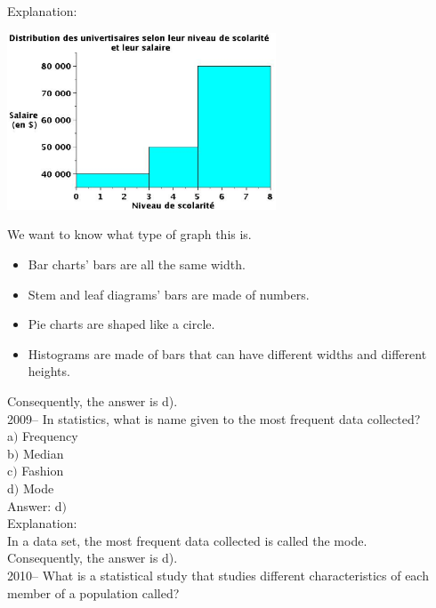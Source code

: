 \documentclass[letterpaper, 12pt]{article}
\begin{document}
Explanation:
\begin{center}
 \includegraphics[width=8cm,bb=14 14 611 415]{Q2008v.eps}
\end{center}
We want to know what type of graph this is.\\
\begin{itemize}
 \item Bar charts' bars are all the same width.\\
 \item Stem and leaf diagrams' bars are made of numbers.\\
 \item Pie charts are shaped like a circle.\\
 \item Histograms are made of bars that can have different widths and different heights.\\
\end{itemize}
Consequently, the answer is d).\\

2009-- In statistics, what is name given to the most frequent data collected?\\

a$)$ Frequency \\
b$)$ Median\\
c$)$ Fashion\\
d$)$ Mode\\

Answer: d$)$\\

Explanation:\\
In a data set, the most frequent data collected is called the mode.\\
Consequently, the answer is d).\\


2010-- What is a statistical study that studies different characteristics of each member of a population called? \\
\end{document}

